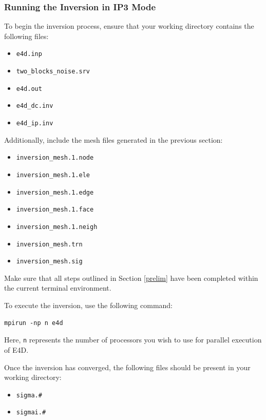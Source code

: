 \documentclass[a4paper,12pt]{article}
\begin{document}
\subsubsection{Running the Inversion in IP3 Mode}

To begin the inversion process, ensure that your working directory contains the following files:

\begin{itemize}
    \item \texttt{e4d.inp}
    \item \texttt{two\_blocks\_noise.srv}
    \item \texttt{e4d.out}
    \item \texttt{e4d\_dc.inv}
    \item \texttt{e4d\_ip.inv}
\end{itemize}

Additionally, include the mesh files generated in the previous section:

\begin{itemize}
    \item \texttt{inversion\_mesh.1.node}
    \item \texttt{inversion\_mesh.1.ele}
    \item \texttt{inversion\_mesh.1.edge}
    \item \texttt{inversion\_mesh.1.face}
    \item \texttt{inversion\_mesh.1.neigh}
    \item \texttt{inversion\_mesh.trn}
    \item \texttt{inversion\_mesh.sig}
\end{itemize}

Make sure that all steps outlined in Section \ref{prelim} have been completed within the current terminal environment.

To execute the inversion, use the following command:

\begin{verbatim}
mpirun -np n e4d
\end{verbatim}

Here, \texttt{n} represents the number of processors you wish to use for parallel execution of E4D.

Once the inversion has converged, the following files should be present in your working directory:

\begin{itemize}
    \item \texttt{sigma.\#}
    \item \texttt{sigmai.\#}
\end{itemize}
\end{document}
